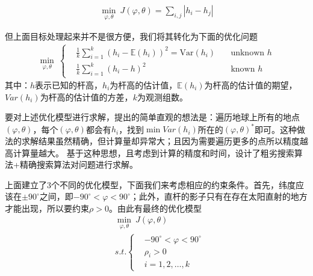             \begin{align*}
            \min_{\varphi,\theta}\ J(\varphi,\theta) = \sum_{i,j}|h_i-h_j|
            \end{align*}
            \par
            但上面目标处理起来并不是很方便，我们将其转化为下面的优化问题
            \begin{align*}
            \min_{\varphi,\theta}\ \left\{
            \begin{aligned}
            & \frac{1}{k}\sum_{i=1}^k(h_i - \mathbb{E}(h_i))^2 = \mathrm{Var}(h_i)\quad&  \text{unknown }h\\
            & \frac{1}{k}\sum_{i=1}^k(h_i-h)^2 \quad&  \text{known }h
            \end{aligned}
            \right.
            \end{align*}
            其中：$h$表示已知的杆高，$h_i$为杆高的估计值，$\mathbb{E}(h_i)$为杆高的估计值的期望，$Var(h_i)$为杆高的估计值的方差，$k$为观测组数。
            \par
            要对上述优化模型进行求解，提出的简单直观的想法是：遍历地球上所有的地点$(\varphi,\theta)$，每个$(\varphi,\theta)$都会有$h_i$，找到$\min Var(h_i )$所在的$(\varphi,\theta)^*$即可。这种做法的求解结果虽然精确，但计算量却异常大；且因为需要遍历更多的点所以精度越高计算量越大。
            基于这种思想，且考虑到计算的精度和时间，设计了粗劣搜索算法+精确搜索算法对问题进行求解。
            \par
            上面建立了3个不同的优化模型，下面我们来考虑相应的约束条件。首先，纬度应该在$\pm 90^\circ$之间，即$-90^\circ<\varphi<90^\circ$；此外，直杆的影子只有在存在太阳直射的地方才能出现，所以要约束$\rho>0$。由此有最终的优化模型
            \begin{align*}
            & \min_{\varphi,\theta}\ J(\varphi,\theta)\\
            & s.t.\left\{
            \begin{aligned}
            & -90^\circ<\varphi<90^\circ\\
            & \rho_i>0\\
            & i=1,2,\dots,k
            \end{aligned}
            \right.
            \end{align*}


